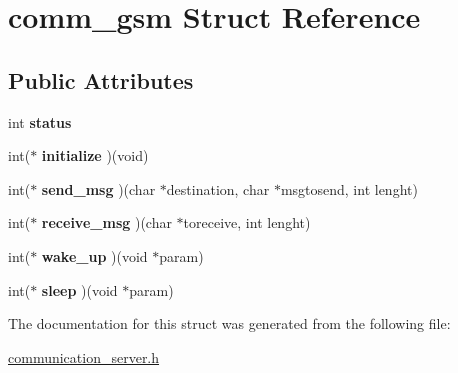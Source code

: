 \hypertarget{structcomm__gsm}{}\section{comm\+\_\+gsm Struct Reference}
\label{structcomm__gsm}
\subsection*{Public Attributes}
\begin{DoxyCompactItemize}
\item 
int {\bfseries status}\hypertarget{structcomm__gsm_a1589a189c3051edf83d767150f2daa8f}{}\label{structcomm__gsm_a1589a189c3051edf83d767150f2daa8f}

\item 
int($\ast$ {\bfseries initialize} )(void)\hypertarget{structcomm__gsm_a075272aa2502eb45a97f4aad3fdc648d}{}\label{structcomm__gsm_a075272aa2502eb45a97f4aad3fdc648d}

\item 
int($\ast$ {\bfseries send\+\_\+msg} )(char $\ast$destination, char $\ast$msgtosend, int lenght)\hypertarget{structcomm__gsm_a652f9ea3777ca9dc06ca3622ae9a3fe7}{}\label{structcomm__gsm_a652f9ea3777ca9dc06ca3622ae9a3fe7}

\item 
int($\ast$ {\bfseries receive\+\_\+msg} )(char $\ast$toreceive, int lenght)\hypertarget{structcomm__gsm_a50c0374112ae3acf46677981341217a3}{}\label{structcomm__gsm_a50c0374112ae3acf46677981341217a3}

\item 
int($\ast$ {\bfseries wake\+\_\+up} )(void $\ast$param)\hypertarget{structcomm__gsm_a410642f22daca5e3d4a8e1e3249a609a}{}\label{structcomm__gsm_a410642f22daca5e3d4a8e1e3249a609a}

\item 
int($\ast$ {\bfseries sleep} )(void $\ast$param)\hypertarget{structcomm__gsm_af652bd59fe1de382f09af3b6f3f8f17d}{}\label{structcomm__gsm_af652bd59fe1de382f09af3b6f3f8f17d}

\end{DoxyCompactItemize}


The documentation for this struct was generated from the following file\+:\begin{DoxyCompactItemize}
\item 
\hyperlink{communication__server_8h}{communication\+\_\+server.\+h}\end{DoxyCompactItemize}
